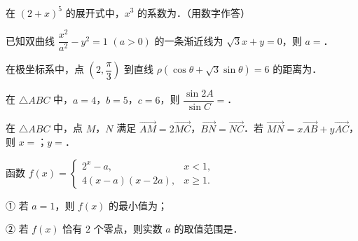 \begin{question}
在 \((2+x)^{5}\) 的展开式中，\(x^{3}\) 的系数为\gkblank{}．（用数字作答）

\end{question}
\begin{question}
已知双曲线 \(\dfrac{x^{2}}{a^{2}}-y^{2}=1\) \((a>0)\) 的一条渐近线为 \(\sqrt{3}x+y=0\)，则 \(a=\)\gkblank{}．

\end{question}
\begin{question}
在极坐标系中，点 \(\left(2,\dfrac{\pi}{3}\right)\) 到直线 \(\rho\left(\cos\theta+\sqrt{3}\sin\theta\right)=6\) 的距离为\gkblank{}．

\end{question}
\begin{question}
在 \(\triangle ABC\) 中，\(a=4\)，\(b=5\)，\(c=6\)，则 \(\dfrac{\sin 2A}{\sin C}=\)\gkblank{}．

\end{question}
\begin{question}
在 \(\triangle ABC\) 中，点 \(M\)，\(N\) 满足 \(\overrightarrow{AM}=2\overrightarrow{MC}\)，\(\overrightarrow{BN}=\overrightarrow{NC}\)．若 \(\overrightarrow{MN}=x\overrightarrow{AB}+y\overrightarrow{AC}\)，则 \(x=\)\gkblank{}；\(y=\)\gkblank{}．

\end{question}
\begin{question}
函数 $f(x)=\begin{cases} 2^{x}-a, & x<1,\\ 4(x-a)(x-2a), & x\geqslant 1. \end{cases}$

① 若 \(a=1\)，则 \(f(x)\) 的最小值为\gkblank{}；

② 若 \(f(x)\) 恰有 \(2\) 个零点，则实数 \(a\) 的取值范围是\gkblank{}．

\end{question}

